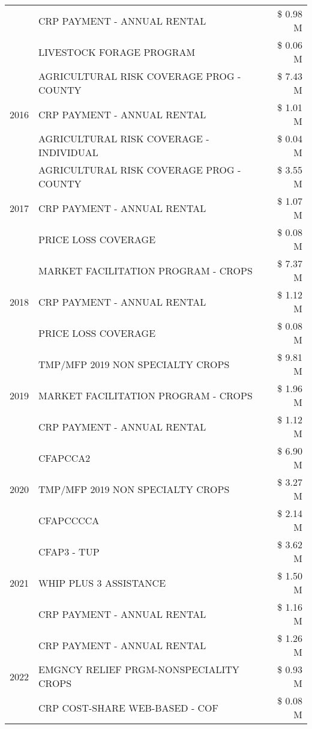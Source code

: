 \begin{tabular}{llr}
 & CRP PAYMENT - ANNUAL RENTAL & \$ 0.98 M \\
 & LIVESTOCK FORAGE PROGRAM & \$ 0.06 M \\
\cline{1-3}
\multirow[t]{3}{*}{2016} & AGRICULTURAL RISK COVERAGE PROG - COUNTY & \$ 7.43 M \\
 & CRP PAYMENT - ANNUAL RENTAL & \$ 1.01 M \\
 & AGRICULTURAL RISK COVERAGE - INDIVIDUAL & \$ 0.04 M \\
\cline{1-3}
\multirow[t]{3}{*}{2017} & AGRICULTURAL RISK COVERAGE PROG - COUNTY & \$ 3.55 M \\
 & CRP PAYMENT - ANNUAL RENTAL & \$ 1.07 M \\
 & PRICE LOSS COVERAGE & \$ 0.08 M \\
\cline{1-3}
\multirow[t]{3}{*}{2018} & MARKET FACILITATION PROGRAM - CROPS & \$ 7.37 M \\
 & CRP PAYMENT - ANNUAL RENTAL & \$ 1.12 M \\
 & PRICE LOSS COVERAGE & \$ 0.08 M \\
\cline{1-3}
\multirow[t]{3}{*}{2019} & TMP/MFP 2019 NON SPECIALTY CROPS & \$ 9.81 M \\
 & MARKET FACILITATION PROGRAM - CROPS & \$ 1.96 M \\
 & CRP PAYMENT - ANNUAL RENTAL & \$ 1.12 M \\
\cline{1-3}
\multirow[t]{3}{*}{2020} & CFAPCCA2 & \$ 6.90 M \\
 & TMP/MFP 2019 NON SPECIALTY CROPS & \$ 3.27 M \\
 & CFAPCCCCA & \$ 2.14 M \\
\cline{1-3}
\multirow[t]{3}{*}{2021} & CFAP3 - TUP & \$ 3.62 M \\
 & WHIP PLUS 3 ASSISTANCE & \$ 1.50 M \\
 & CRP PAYMENT - ANNUAL RENTAL & \$ 1.16 M \\
\cline{1-3}
\multirow[t]{3}{*}{2022} & CRP PAYMENT - ANNUAL RENTAL & \$ 1.26 M \\
 & EMGNCY RELIEF PRGM-NONSPECIALITY CROPS & \$ 0.93 M \\
 & CRP COST-SHARE WEB-BASED - COF & \$ 0.08 M \\
\cline{1-3}
\bottomrule
\end{tabular}
